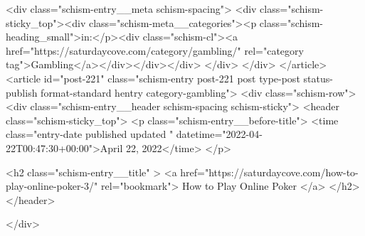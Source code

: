 {		<div class="schism-entry__meta schism-spacing">			<div class="schism-sticky_top"><div class="schism-meta__categories"><p class="schism-heading_small">in:</p><div class="schism-cl"><a href="https://saturdaycove.com/category/gambling/" rel="category tag">Gambling</a></div></div></div>		</div>
	</div>
</article>
<article id="post-221" class="schism-entry post-221 post type-post status-publish format-standard hentry category-gambling">
	<div class="schism-row">		<div class="schism-entry__header schism-spacing schism-sticky">			<header class="schism-sticky_top">				<p class="schism-entry__before-title">
					<time class="entry-date published updated " datetime="2022-04-22T00:47:30+00:00">April 22, 2022</time>				</p>

				<h2 class="schism-entry__title" >
					<a href="https://saturdaycove.com/how-to-play-online-poker-3/" rel="bookmark">
						How to Play Online Poker					</a>
				</h2>
			</header>

					</div>

}
